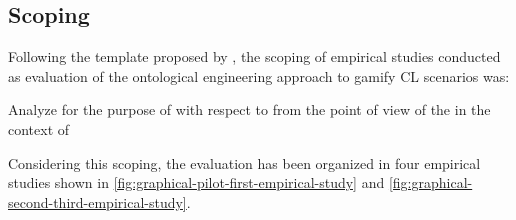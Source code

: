 \subsection{Scoping}
\label{subsec:scoping}

Following the template proposed by , the scoping of empirical studies conducted as evaluation of the ontological engineering approach to gamify CL scenarios was:

Analyze  for the purpose of  with respect to  from the point of view of the  in the context of 

Considering this scoping, the evaluation has been organized in four empirical studies shown in \autoref{fig:graphical-pilot-first-empirical-study} and \autoref{fig:graphical-second-third-empirical-study}.

